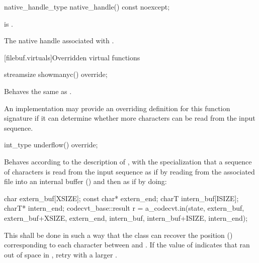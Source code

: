 %
\begin{itemdecl}
native_handle_type native_handle() const noexcept;
\end{itemdecl}

\begin{itemdescr}
\pnum
\expects
{} is .

\pnum
\returns
The native handle associated with .
\end{itemdescr}

[filebuf.virtuals]{Overridden virtual functions}

%
\begin{itemdecl}
streamsize showmanyc() override;
\end{itemdecl}

\begin{itemdescr}
\pnum
\effects
Behaves the same as
.
%

\pnum
\remarks
An
implementation may provide an overriding definition for this function
signature if it can determine whether more characters can be read from the input
sequence.
\end{itemdescr}

%
\begin{itemdecl}
int_type underflow() override;
\end{itemdecl}

\begin{itemdescr}
\pnum
\effects
Behaves according to the description of
,
with the specialization that a sequence of characters is read from the input
sequence as if by reading from the associated file
into an internal buffer ()
and then as if by doing:

\begin{codeblock}
char         extern_buf[XSIZE];
const char*  extern_end;
charT        intern_buf[ISIZE];
charT*       intern_end;
codecvt_base::result r =
  a_codecvt.in(state, extern_buf, extern_buf+XSIZE, extern_end,
               intern_buf, intern_buf+ISIZE, intern_end);
\end{codeblock}

This shall be done in such a way that the class can recover the
position
()
corresponding to each character between
and
.
If the value of
indicates that
ran out of space in
,
retry with a larger
.
\end{itemdescr}

